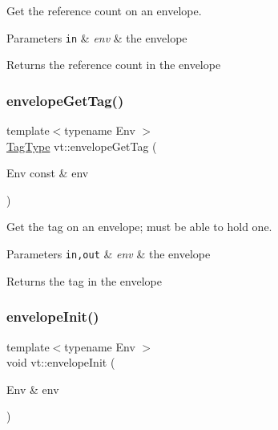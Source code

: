 Get the reference count on an envelope. 


\begin{DoxyParams}[1]{Parameters}
\mbox{\tt in}  & {\em env} & the envelope\\
\hline
\end{DoxyParams}
\begin{DoxyReturn}{Returns}
the reference count in the envelope 
\end{DoxyReturn}
\mbox{\label{namespacevt_af16ad10e40d8a2f2c1128068774c1bc4}} 
\subsubsection{\texorpdfstring{envelope\+Get\+Tag()}{envelopeGetTag()}}
{\footnotesize\ttfamily template$<$typename Env $>$ \\
\hyperlink{namespacevt_a84ab281dae04a52a4b243d6bf62d0e52}{Tag\+Type} vt\+::envelope\+Get\+Tag (\begin{DoxyParamCaption}\item[{Env const \&}]{env }\end{DoxyParamCaption})\hspace{0.3cm}{\ttfamily [inline]}}



Get the tag on an envelope; must be able to hold one. 


\begin{DoxyParams}[1]{Parameters}
\mbox{\tt in,out}  & {\em env} & the envelope\\
\hline
\end{DoxyParams}
\begin{DoxyReturn}{Returns}
the tag in the envelope 
\end{DoxyReturn}
\mbox{\label{namespacevt_a26b669aa49c2c9fa4a0fb88902518adb}} 
\subsubsection{\texorpdfstring{envelope\+Init()}{envelopeInit()}}
{\footnotesize\ttfamily template$<$typename Env $>$ \\
void vt\+::envelope\+Init (\begin{DoxyParamCaption}\item[{Env \&}]{env }\end{DoxyParamCaption})\hspace{0.3cm}{\ttfamily [inline]}}



